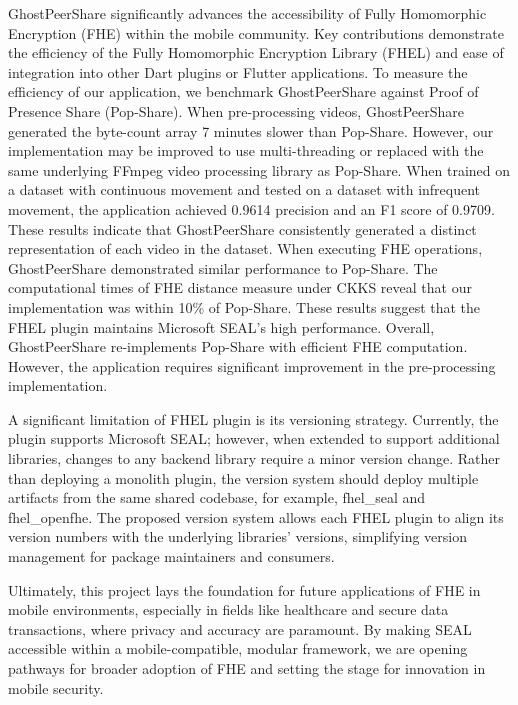 GhostPeerShare significantly advances the accessibility of Fully Homomorphic Encryption (FHE) within the mobile community. Key contributions demonstrate the efficiency of the Fully Homomorphic Encryption Library (FHEL) and ease of integration into other Dart plugins or Flutter applications.
To measure the efficiency of our application, we benchmark GhostPeerShare against Proof of Presence Share (Pop-Share).
When pre-processing videos, GhostPeerShare generated the byte-count array 7 minutes slower than Pop-Share. However, our implementation may be improved to use multi-threading or replaced with the same underlying FFmpeg video processing library as Pop-Share.
When trained on a dataset with continuous movement and tested on a dataset with infrequent movement, the application achieved 0.9614 precision and an F1 score of 0.9709. These results indicate that GhostPeerShare consistently generated a distinct representation of each video in the dataset.
When executing FHE operations, GhostPeerShare demonstrated similar performance to Pop-Share. The computational times of FHE distance measure under CKKS reveal that our implementation was within 10\% of Pop-Share. These results suggest that the FHEL plugin maintains Microsoft SEAL's high performance.
Overall, GhostPeerShare re-implements Pop-Share with efficient FHE computation. However, the application requires significant improvement in the pre-processing implementation. 

A significant limitation of FHEL plugin is its versioning strategy. Currently, the plugin supports Microsoft SEAL; however, when extended to support additional libraries, changes to any backend library require a minor version change. Rather than deploying a monolith plugin, the version system should deploy multiple artifacts from the same shared codebase, for example, fhel\_seal and fhel\_openfhe. The proposed version system allows each FHEL plugin to align its version numbers with the underlying libraries' versions, simplifying version management for package maintainers and consumers.

Ultimately, this project lays the foundation for future applications of FHE in mobile environments, especially in fields like healthcare and secure data transactions, where privacy and accuracy are paramount. By making SEAL accessible within a mobile-compatible, modular framework, we are opening pathways for broader adoption of FHE and setting the stage for innovation in mobile security.
